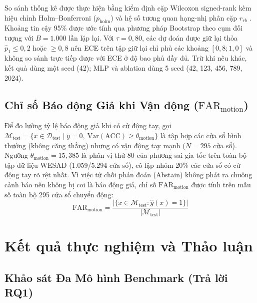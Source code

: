 \documentclass[conference]{IEEEtran}
\begin{document}
So sánh thống kê được thực hiện bằng kiểm định cặp Wilcoxon signed-rank \cite{wilcoxon1945individual} kèm hiệu chỉnh Holm--Bonferroni \cite{holm1979simple, demsar2006statistical} ($p_{\text{holm}}$) và hệ số tương quan hạng-nhị phân cặp $r_{rb}$ \cite{kerby2014simple}. Khoảng tin cậy 95\% được ước tính qua phương pháp Bootstrap \cite{efron1993bootstrap} theo cụm đối tượng với $B=1.000$ lần lặp lại. Với $\tau=0,80$, các dự đoán được giữ lại thỏa $\hat p_1\le 0,2$ hoặc $\ge 0,8$ nên ECE trên tập giữ lại chỉ phủ các khoảng $[0,8;1,0]$ và không so sánh trực tiếp được với ECE ở độ bao phủ đầy đủ. Trừ khi nêu khác, kết quả dùng một seed (42); MLP và ablation dùng 5 seed (42, 123, 456, 789, 2024).

\subsection{Chỉ số Báo động Giả khi Vận động ($\text{FAR}_{\text{motion}}$)}
Để đo lường tỷ lệ báo động giả khi có cử động tay, gọi $\mathcal{M}_{\text{test}} = \{x \in \mathcal{D}_{\text{test}} \mid y=0, \ \text{Var}(\text{ACC}) \ge \theta_{\text{motion}}\}$ là tập hợp các cửa sổ bình thường (không căng thẳng) nhưng có vận động tay mạnh ($N=295$ cửa sổ). Ngưỡng $\theta_{\text{motion}} = 15,385$ là phân vị thứ 80 của phương sai gia tốc trên toàn bộ tập dữ liệu WESAD (1.059/5.294 cửa sổ), cô lập nhóm 20\% các cửa sổ có cử động tay rõ rệt nhất. Vì việc từ chối phán đoán (Abstain) không phát ra chuông cảnh báo nên không bị coi là báo động giả, chỉ số $\text{FAR}_{\text{motion}}$ được tính trên mẫu số toàn bộ 295 cửa sổ chuyển động:
\begin{equation}
\text{FAR}_{\text{motion}} = \frac{|\{x \in \mathcal{M}_{\text{test}} : \hat{y}(x) = 1\}|}{|\mathcal{M}_{\text{test}}|}
\end{equation}

\section{Kết quả thực nghiệm và Thảo luận}

\subsection{Khảo sát Đa Mô hình Benchmark (Trả lời RQ1)}
\end{document}
